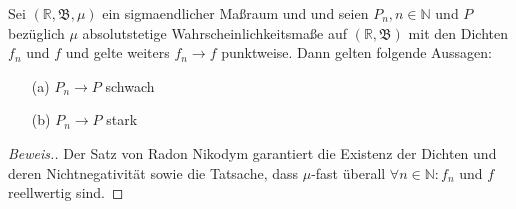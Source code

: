 \begin{lemma}
    Sei $(\mathbb{R},\mathfrak{B},\mu)$ ein sigmaendlicher Maßraum und und seien $P_n,n\in\mathbb{N}$ und $P$ bezüglich $\mu$ absolutstetige Wahrscheinlichkeitsmaße auf $(\mathbb{R},\mathfrak{B})$ mit den Dichten $f_n$ und $f$ und gelte weiters $f_n\to f$ punktweise. Dann gelten folgende Aussagen:
    \begin{itemize}
        \item[(a)] $P_n\to P$ schwach
        \item[(b)] $P_n\to P$ stark 
    \end{itemize}
\end{lemma}
\begin{proof}[Beweis.]
    Der Satz von Radon Nikodym \cite[Satz 11.19]{zbMATH06257850} garantiert die Existenz der Dichten und deren Nichtnegativität sowie die Tatsache, dass $\mu$-fast überall $\forall n\in\mathbb{N}:f_n$ und $f$ reellwertig sind.
\end{proof}